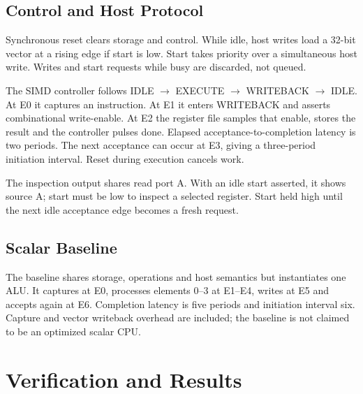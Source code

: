 \documentclass[conference]{IEEEtran}
\begin{document}
\subsection{Control and Host Protocol}
Synchronous reset clears storage and control. While idle, host writes load a 32-bit vector at a rising edge if start is low. Start takes priority over a simultaneous host write. Writes and start requests while busy are discarded, not queued.

The SIMD controller follows IDLE $\rightarrow$ EXECUTE $\rightarrow$ WRITEBACK $\rightarrow$ IDLE. At E0 it captures an instruction. At E1 it enters WRITEBACK and asserts combinational write-enable. At E2 the register file samples that enable, stores the result and the controller pulses done. Elapsed acceptance-to-completion latency is two periods. The next acceptance can occur at E3, giving a three-period initiation interval. Reset during execution cancels work.

The inspection output shares read port A. With an idle start asserted, it shows source A; start must be low to inspect a selected register. Start held high until the next idle acceptance edge becomes a fresh request.

\subsection{Scalar Baseline}
The baseline shares storage, operations and host semantics but instantiates one ALU. It captures at E0, processes elements 0--3 at E1--E4, writes at E5 and accepts again at E6. Completion latency is five periods and initiation interval six. Capture and vector writeback overhead are included; the baseline is not claimed to be an optimized scalar CPU.

\section{Verification and Results}
\end{document}
